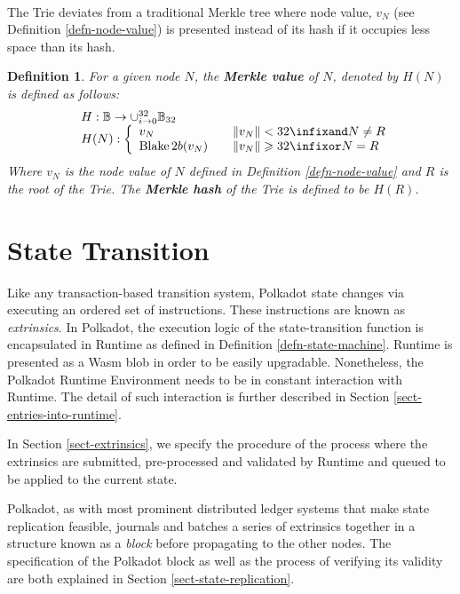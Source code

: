 \documentclass{book}
\newcommand{\tmem}[1]{{\em #1\/}}
\newcommand{\tmop}[1]{\ensuremath{\operatorname{#1}}}
\newcommand{\tmstrong}[1]{\textbf{#1}}
\newcommand{\tmtextbf}[1]{{\bfseries{#1}}}
\newcommand{\tmtextit}[1]{{\itshape{#1}}}
\newtheorem{definition}{Definition}
\providecommand{\tmem}[1]{\tmtextit{#1}}
\providecommand{\tmop}[1]{\ensuremath{\mathrm{#1}}}
\providecommand{\tmstrong}[1]{\tmtextbf{#1}}
\providecommand{\tmtextbf}[1]{\tmtextbf{#1}}
\providecommand{\tmtextit}[1]{\tmtextit{#1}}
\newtheorem{definition}{Definition}
\begin{document}
\

The Trie deviates from a traditional Merkle tree where node value, $v_N$ (see
Definition \ref{defn-node-value}) is presented instead of its hash if it
occupies less space than its hash.

\begin{definition}
  \label{defn-merkle-value}For a given node $N$, the {\tmstrong{Merkle value}}
  of $N$, denoted by $H (N)$ is defined as follows:
  \[ \begin{array}{ll}
       & H : \mathbb{B} \rightarrow \cup_{i \rightarrow 0}^{32}
       \mathbb{B}_{32}\\
       & H (N) : \left\{ \begin{array}{lcl}
         v_N &  & \|v_N \|< 32 \infixand N \neq R\\
         \tmop{Blake} 2 b (v_N) &  & \|v_N \| \geqslant 32 \infixor N = R
       \end{array} \right.
     \end{array} \]
  Where $v_N$ is the node value of $N$ defined in Definition
  \ref{defn-node-value} and $R$ is the root of the Trie. The {\tmstrong{Merkle
  hash}} of the Trie is defined to be $H (R)$.
\end{definition}

\chapter{State Transition}\label{chap-state-transit}

Like any transaction-based transition system, Polkadot state changes via
executing an ordered set of instructions. These instructions are known as
{\tmem{extrinsics}}. In Polkadot, the execution logic of the state-transition
function is encapsulated in Runtime as defined in Definition
\ref{defn-state-machine}. Runtime is presented as a Wasm blob in order to be
easily upgradable. Nonetheless, the Polkadot Runtime Environment needs to be
in constant interaction with Runtime. The detail of such interaction is
further described in Section \ref{sect-entries-into-runtime}.

In Section \ref{sect-extrinsics}, we specify the procedure of the process
where the extrinsics are submitted, pre-processed and validated by Runtime and
queued to be applied to the current state.

Polkadot, as with most prominent distributed ledger systems that make state
replication feasible, journals and batches a series of extrinsics together in
a structure known as a {\tmem{block}} before propagating to the other nodes.
The specification of the Polkadot block as well as the process of verifying
its validity are both explained in Section \ref{sect-state-replication}.
\end{document}

